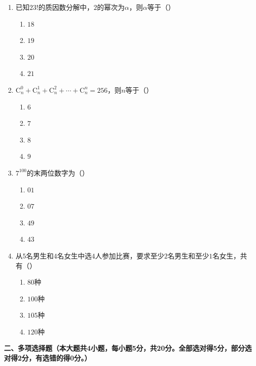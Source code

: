 \documentclass[12pt, a4paper]{ctexart}
\begin{document}
\begin{enumerate}[label=\Alph*.]
\item 已知$23!$的质因数分解中，$2$的幂次为$\alpha$，则$\alpha$等于（\quad）
\begin{enumerate}[label=]
\item $18$ \qquad \item $19$ \qquad \item $20$ \qquad \item $21$
\end{enumerate}

\item $\mathrm{C}_n^0+\mathrm{C}_n^1+\mathrm{C}_n^2+\cdots+\mathrm{C}_n^n=256$，则$n$等于（\quad）
\begin{enumerate}[label=]
\item $6$ \qquad \item $7$ \qquad \item $8$ \qquad \item $9$
\end{enumerate}

\item $7^{100}$的末两位数字为（\quad）
\begin{enumerate}[label=]
\item $01$ \qquad \item $07$ \qquad \item $49$ \qquad \item $43$
\end{enumerate}

\item 从$5$名男生和$4$名女生中选$4$人参加比赛，要求至少$2$名男生和至少$1$名女生，共有（\quad）
\begin{enumerate}[label=]
\item $80$种 \qquad \item $100$种 \qquad \item $105$种 \qquad \item $120$种
\end{enumerate}

\end{enumerate}

\vspace{0.5em}

\noindent\textbf{二、多项选择题（本大题共4小题，每小题5分，共20分。全部选对得5分，部分选对得2分，有选错的得0分。）}
\end{document}
